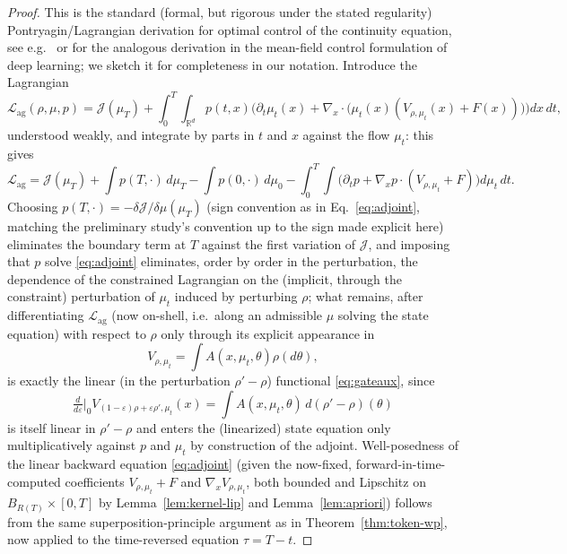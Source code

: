 \documentclass[11pt,a4wide]{article}
\theoremstyle{definition}
\newcommand{\R}{\mathbb{R}}
\begin{document}
% 
%
\begin{proof}\iffalse 
This is the standard (formal, but rigorous under the stated regularity) Pontryagin/Lagrangian derivation for optimal control of the continuity equation, see e.g.\ \cite[Ch.~6]{carmona2018probabilistic} or \cite{e2019meanfield} for the analogous derivation in the mean-field control formulation of deep learning; we sketch it for completeness in our notation. Introduce the Lagrangian
\[
\mathcal L_{\mathrm{ag}}(\rho,\mu,p) = \mathcal J(\mu_T) + \int_0^T\!\!\int_{\R^d} p(t,x)\Big(\partial_t\mu_t(x) + \nabla_x\cdot\big(\mu_t(x)(V_{\rho,\mu_t}(x)+F(x))\big)\Big)dx\,dt,
\]
understood weakly, and integrate by parts in $t$ and $x$ against the flow $\mu_t$: this gives
\[
\mathcal L_{\mathrm{ag}} = \mathcal J(\mu_T) + \int p(T,\cdot)\,d\mu_T - \int p(0,\cdot)\,d\mu_0 - \int_0^T\!\!\int \Big(\partial_tp + \nabla_xp\cdot(V_{\rho,\mu_t}+F)\Big)d\mu_t\,dt.
\]
Choosing $p(T,\cdot)=-\delta\mathcal J/\delta\mu(\mu_T)$ (sign convention as in Eq.~\eqref{eq:adjoint}, matching the preliminary study's convention up to the sign made explicit here) eliminates the boundary term at $T$ against the first variation of $\mathcal J$, and imposing that $p$ solve \eqref{eq:adjoint} eliminates, order by order in the perturbation, the dependence of the constrained Lagrangian on the (implicit, through the constraint) perturbation of $\mu_t$ induced by perturbing $\rho$; what remains, after differentiating $\mathcal L_{\mathrm{ag}}$ (now on-shell, i.e.\ along an admissible $\mu$ solving the state equation) with respect to $\rho$ only through its explicit appearance in 
$$
V_{\rho,\mu_t}=\int A(x,\mu_t,\theta)\rho(d\theta),
$$
 is exactly the linear (in the perturbation $\rho'-\rho$) functional \eqref{eq:gateaux}, since 
 $$
 \tfrac{d}{d\varepsilon}|_0 V_{(1-\varepsilon)\rho+\varepsilon\rho',\mu_t}(x) = \int A(x,\mu_t,\theta)\,d(\rho'-\rho)(\theta)
 $$ 
 is itself linear in $\rho'-\rho$ and enters the (linearized) state equation only multiplicatively against $p$ and $\mu_t$ by construction of the adjoint. Well-posedness of the linear backward equation \eqref{eq:adjoint} (given the now-fixed, forward-in-time-computed coefficients $V_{\rho,\mu_t}+F$ and $\nabla_xV_{\rho,\mu_t}$, both bounded and Lipschitz on $B_{R(T)}\times[0,T]$ by Lemma~\ref{lem:kernel-lip} and Lemma~\ref{lem:apriori}) follows from the same superposition-principle argument as in Theorem~\ref{thm:token-wp}, now applied to the time-reversed equation $\tau=T-t$. 

\end{proof}
\end{document}
